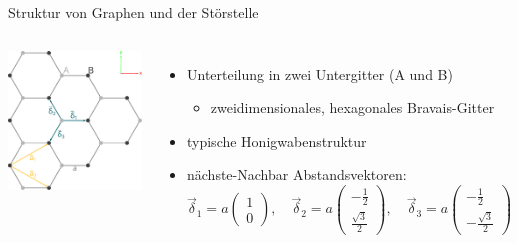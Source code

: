 \documentclass[aspectratio=1610, 9pt, xcolor=dvipsnames]{beamer}
\begin{document}
\begin{frame}{Struktur von Graphen und der Störstelle}
  \begin{columns}
        \centering
        \includegraphics[width = 0.96 \textwidth]{Plots/graphene_lattice.pdf}
      \begin{itemize}
        \item Unterteilung in zwei Untergitter (A und B)
        \begin{itemize}
          \item[\textrightarrow] zweidimensionales, hexagonales Bravais-Gitter 
        \end{itemize}
        \item typische Honigwabenstruktur
        \item nächste-Nachbar Abstandsvektoren:
      \begin{equation*}
        \vec{\delta}_1 = a \begin{pmatrix} 1            \\[4pt] 0                   \end{pmatrix}, \quad
        \vec{\delta}_2 = a \begin{pmatrix} -\frac{1}{2} \\[4pt] \frac{\sqrt{3}}{2}  \end{pmatrix}, \quad 
        \vec{\delta}_3 = a \begin{pmatrix} -\frac{1}{2} \\[4pt] -\frac{\sqrt{3}}{2} \end{pmatrix} \label{eqn:nnvec}
    \end{equation*}
  \end{itemize}
  \end{columns}
\end{frame}
\end{document}
